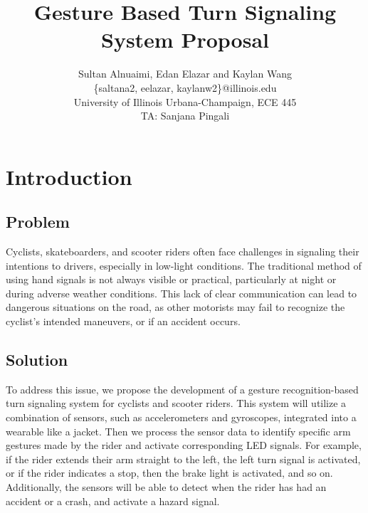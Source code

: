 \documentclass[12pt]{article}
\begin{document}
\title{Gesture Based Turn Signaling System Proposal}

\author{Sultan Alnuaimi, Edan Elazar and Kaylan Wang\\
\small \{saltana2, eelazar, kaylanw2\}@illinois.edu\\
\small University of Illinois Urbana-Champaign, ECE 445\\
\small TA: Sanjana Pingali}
\maketitle


\section{Introduction}
\subsection{Problem}
Cyclists, skateboarders, and scooter riders often face 
challenges in signaling their intentions to drivers, 
especially in low-light conditions. The traditional
 method of using hand signals is not always visible or 
 practical, particularly at night or during adverse weather 
 conditions. This lack of clear communication can lead to 
 dangerous situations on the road, as other motorists may 
 fail to recognize the cyclist's intended maneuvers, or if 
 an accident occurs. 

\subsection{Solution}

To address this issue, we propose the development of a gesture 
recognition-based turn signaling system for cyclists and scooter 
riders. This system will utilize a combination of sensors, such 
as accelerometers and gyroscopes, integrated into a wearable 
like a jacket. Then we process the sensor data to identify 
specific arm gestures made by the rider and activate corresponding 
LED signals. For example, if the rider extends their arm straight 
to the left, the left turn signal is activated, or if the rider 
indicates a stop, then the brake light is activated, and so on. 
Additionally, the sensors will be able to detect when the rider 
has had an accident or a crash, and activate a hazard signal. 
\end{document}
